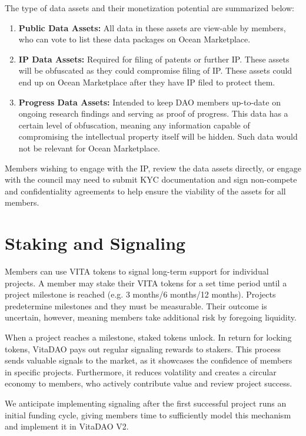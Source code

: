 \documentclass[12pt,letterpaper]{article}
\begin{document}
The type of data assets and their monetization potential are summarized below:
\begin{enumerate}
\item \textbf{Public Data Assets:} All data in these assets are view-able by members, who can vote to list these data packages on Ocean Marketplace.
\item \textbf{IP Data Assets:} Required for filing of patents or further IP. These assets will be obfuscated as they could compromise filing of IP. These assets could end up on Ocean Marketplace after they have IP filed to protect them.
\item \textbf{Progress Data Assets:} Intended to keep DAO members up-to-date on ongoing research findings and serving as proof of progress. This data has a certain level of obfuscation, meaning any information capable of compromising the intellectual property itself will be hidden. Such data would not be relevant for Ocean Marketplace.
\end{enumerate}
Members wishing to engage with the IP, review the data assets directly, or engage with the council may need to submit KYC documentation and sign non-compete and confidentiality agreements to help ensure the viability of the assets for all members.

\section{Staking and Signaling}
Members can use VITA tokens to signal long-term support for individual projects. A member may stake their VITA tokens for a set time period until a project milestone is reached (e.g. 3 months/6 months/12 months). Projects predetermine milestones and they must be measurable. Their outcome is uncertain, however, meaning members take additional risk by foregoing liquidity.

When a project reaches a milestone, staked tokens unlock. In return for locking tokens, VitaDAO pays out regular signaling rewards to stakers. This process sends valuable signals to the market, as it showcases the confidence of members in specific projects. Furthermore, it reduces volatility and creates a circular economy to members, who actively contribute value and review project success.

We anticipate implementing signaling after the first successful project runs an initial funding cycle, giving members time to sufficiently model this mechanism and implement it in VitaDAO V2.
\end{document}
